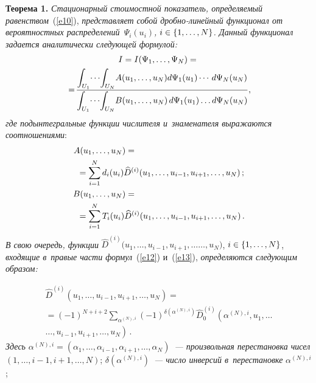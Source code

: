 \begin{multicols}{2}
\smallskip

\noindent
\textbf{Теорема 1.} \textit{Стационарный стоимостной показатель, 
определяемый равенством}~(\ref{e10}), \textit{представляет собой дроб\-но-ли\-ней\-ный
функционал от вероятностных распределений~$\Psi_{i}(u_{i})$,
$i\hm\in\{1,\dots,N\}$. Данный функционал задается
аналитически следующей формулой:}
\begin{multline}
I=I(\Psi_{1},\ldots, \Psi_{N})={}\\
\hspace*{-2mm}{}=\!
\fr{\int\nolimits_{U_1}\!{\cdots\! 
\int\nolimits_{U_N}\!{A(u_{1},\ldots ,u_{N})d\Psi_{1}(u_{1})\cdots
\,d\Psi_{N}(u_{N})}}}{\int\nolimits_{U_1}{\!\cdots\! \int\nolimits_{U_N}\!{B(u_{1},\ldots ,u_{N})
\,d\Psi_{1}(u_{1})\ldots
d\Psi_{N}(u_{N})}}},\!\!\! \label{e11}
\end{multline}
\textit{где подынтегральные функции числителя и~знаменателя выражаются
соотношениями}:
\begin{align}
A(u_{1},\ldots
,u_{N})&={}\notag\\
&\hspace*{-20mm}{}=\sum\limits_{i=1}^{N}{d_{i}(u_{i})}{\widehat{D}}^{(i)}(u_{1}, \ldots
,u_{i-1},u_{i+1}, \ldots , u_{N})\,;  \label{e12}\\
 B(u_{1},\ldots
,u_{N})&={}\notag\\
&\hspace*{-20mm}{}=\sum\limits_{i=1}^{N}{T_{i}(u_{i})}{\widehat{D}}^{(i)}(u_{1}, \ldots
,u_{i-1},u_{i+1}, \ldots , u_{N})\,.  \label{e13}
\end{align}
\textit{В свою очередь, функции} ${\widehat{D}}^{(i)}(u_{1}, \ldots
,u_{i-1},u_{i+1}, \ldots$\linebreak $\ldots , u_{N})$, $i\hm\in\{1,\dots,N\}$, 
\textit{входящие в~правые части формул}~(\ref{e12}) и~(\ref{e13}), 
\textit{определяются следующим образом:}

\noindent
\begin{multline}
{\widehat{D}}^{(i)}(u_{1}, \ldots ,u_{i-1},u_{i+1}, \ldots , u_{N})={}
\\
{}=(-1)^{N+i+2}\sum\limits_{\alpha ^{(N),i}}{(-1)}^{\delta (\alpha
^{(N),i}) }{\widehat{D}}_{0}^{(i)}\left(\alpha ^{(N),i},u_{1}, \ldots\right.\\
\left.\ldots , u_{i-1},u_{i+1}, \ldots , u_{N}\right)\,. \label{e14}
\end{multline}
\textit{Здесь} $\alpha ^{(N),i}=(\alpha _{1}, \ldots , \alpha _{i-1},\alpha_{i+1}, \ldots , 
\alpha _{N})$~\textit{--- произвольная
перестановка чисел }$(1, \ldots , i-1, i+1, \ldots , N)$;
$\delta
(\alpha ^{(N),i})$~\textit{--- число инверсий в~перестановке} 
$\alpha ^{(N),i}$;


\end{multicols}
